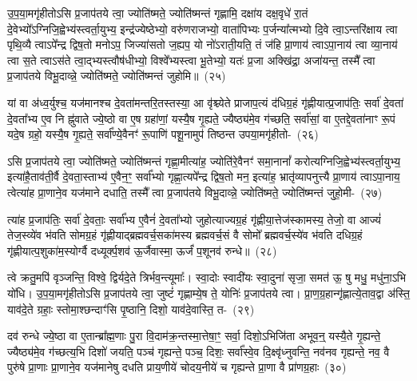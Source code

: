 {\anuvakamend[{जु॒हूरथो॒ ब्रह्म॑ स्रु॒चाꣳ स॒प्तद॑श च}]}%

उ॒प॒या॒मगृ॑हीतो\-ऽसि प्र॒जा\-प॑तये त्वा॒ ज्योति॑ष्मते॒ ज्योति॑ष्मन्तं गृह्णामि॒ दक्षा॑य दक्ष॒वृधे॑ रा॒तं दे॒वेभ्यो᳚\-ऽग्निजि॒ह्वेभ्य॑\-स्त्वर्ता॒युभ्य॒ इन्द्र॑ज्येष्ठेभ्यो॒ वरु॑णराजभ्यो॒ वाता॑पिभ्यः प॒र्जन्या᳚त्मभ्यो दि॒वे त्वा॒ऽन्तरि॑क्षाय त्वा पृथि॒व्यै त्वा\-ऽपे᳚न्द्र द्विष॒तो मनो\-ऽप॒ जिज्या॑सतो ज॒ह्यप॒ यो नो॑\-ऽराती॒यति॒ तं ज॑हि प्रा॒णाय॑ त्वा\-ऽपा॒नाय॑ त्वा व्या॒नाय॑ त्वा स॒ते त्वा\-ऽस॑ते त्वा॒द्भ्यस्त्वौष॑धीभ्यो॒ विश्वे᳚भ्यस्त्वा भू॒तेभ्यो॒ यतः॑ प्र॒जा अक्खि॑द्रा॒ अजा॑यन्त॒ तस्मै᳚ त्वा प्र॒जा\-प॑तये विभू॒दाव्न्ने॒ ज्योति॑ष्मते॒ ज्योति॑ष्मन्तं जुहोमि॥~(२५)

{\anuvakamend[{ओष॑धीभ्य॒श्चतु॑र्दश च}]}%

यां वा अ॑ध्व॒र्युश्च॒ यज॑मानश्च दे॒वता॑मन्तरि॒तस्तस्या॒ आ वृ॑श्च्येते प्राजाप॒त्यं द॑धिग्र॒हं गृ॑ह्णीयात्प्र॒जा\-प॑तिः॒ सर्वा॑ दे॒वता॑ दे॒वता᳚भ्य ए॒व नि ह्नु॑वाते ज्ये॒ष्ठो वा ए॒ष ग्रहा॑णां॒ यस्यै॒ष गृ॒ह्यते॒ ज्यैष्ठ्य॑मे॒व ग॑च्छति॒ सर्वा॑सां॒ वा ए॒तद्दे॒वता॑नाꣳ रू॒पं यदे॒ष ग्रहो॒ यस्यै॒ष गृ॒ह्यते॒ सर्वा᳚ण्ये॒वैनꣳ॑ रू॒पाणि॑ पशू॒नामुप॑ तिष्ठन्त उपया॒मगृ॑हीतो-~(२६)

ऽसि प्र॒जा\-प॑तये त्वा॒ ज्योति॑ष्मते॒ ज्योति॑ष्मन्तं गृह्णा॒मीत्या॑ह॒ ज्योति॑रे॒वैनꣳ॑ समा॒नानां᳚ करोत्यग्निजि॒ह्वेभ्य॑स्त्वर्ता॒युभ्य॒ इत्या॑है॒ताव॑ती॒र्वै दे॒वता॒स्ताभ्य॑ ए॒वैन॒ꣳ॒ सर्वा᳚भ्यो गृह्णा॒त्यपे᳚न्द्र द्विष॒तो मन॒ इत्या॑ह॒ भ्रातृ॑व्यापनुत्त्यै प्रा॒णाय॑ त्वाऽपा॒नाय॒ त्वेत्या॑ह प्रा॒णाने॒व यज॑माने दधाति॒ तस्मै᳚ त्वा प्र॒जा\-प॑तये विभू॒दाव्न्ने॒ ज्योति॑ष्मते॒ ज्योति॑ष्मन्तं जुहो॒मी-~(२७)

त्या॑ह प्र॒जा\-प॑तिः॒ सर्वा॑ दे॒वताः॒ सर्वा᳚भ्य ए॒वैनं॑ दे॒वता᳚भ्यो जुहोत्याज्यग्र॒हं गृ॑ह्णीया॒त्तेज॑स्कामस्य॒ तेजो॒ वा आज्यं॑ तेज॒स्व्ये॑व भ॑वति सोमग्र॒हं गृ॑ह्णीयाद्ब्रह्मवर्च॒सका॑मस्य ब्रह्मवर्च॒सं वै सोमो᳚ ब्रह्मवर्च॒स्ये॑व भ॑वति दधिग्र॒हं गृ॑ह्णीयात्प॒शुका॑म॒स्योर्ग्वै दध्यूर्क्प॒शव॑ ऊ॒र्जैवास्मा॒ ऊर्जं॑ प॒शूनव॑ रुन्धे॥~(२८)

{\anuvakamend[{उ॒प॒या॒मगृ॑हीतो जुहोमि॒ त्रिच॑त्वारिꣳशच्च}]}%

त्वे क्रतु॒मपि॑ वृञ्जन्ति॒ विश्वे॒ द्विर्यदे॒ते त्रिर्भव॒न्त्यूमाः᳚। स्वा॒दोः स्वादी॑यः स्वा॒दुना॑ सृजा॒ समत॑ ऊ॒ षु मधु॒ मधु॑ना॒ऽभि यो॑धि। उ॒प॒या॒मगृ॑हीतो\-ऽसि प्र॒जा\-प॑तये त्वा॒ जुष्टं॑ गृह्णाम्ये॒ष ते॒ योनिः॑ प्र॒जा\-प॑तये त्वा। प्रा॒ण॒ग्र॒हान्गृ॑ह्णात्ये॒ताव॒द्वा अ॑स्ति॒ याव॑दे॒ते ग्रहाः॒ स्तोमा॒श्छन्दाꣳ॑सि पृ॒ष्ठानि॒ दिशो॒ याव॑दे॒वास्ति॒ त-~(२९)

दव॑ रुन्धे ज्ये॒ष्ठा वा ए॒तान्ब्रा᳚ह्म॒णाः पु॒रा वि॒दाम॑क्र॒न्तस्मा॒त्तेषा॒ꣳ॒ सर्वा॒ दिशो॒\-ऽभिजि॑ता अभूव॒न्॒ यस्यै॒ते गृ॒ह्यन्ते॒ ज्यैष्ठ्य॑मे॒व ग॑च्छत्य॒भि दिशो॑ जयति॒ पञ्च॑ गृह्यन्ते॒ पञ्च॒ दिशः॒ सर्वा᳚स्वे॒व दि॒क्ष्वृ॑ध्नुवन्ति॒ नव॑नव गृह्यन्ते॒ नव॒ वै पुरु॑षे प्रा॒णाः प्रा॒णाने॒व यज॑मानेषु दधति प्राय॒णीये॑ चोदय॒नीये॑ च गृह्यन्ते प्रा॒णा वै प्रा॑णग्र॒हाः~(३०)

